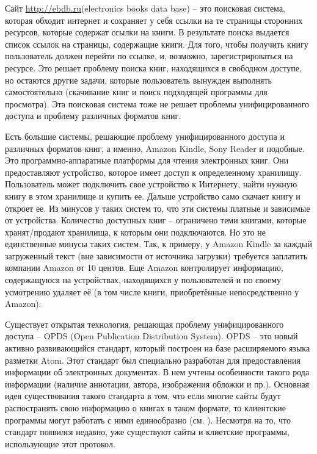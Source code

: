 \documentclass[a4paper]{report}
\begin{document}
Сайт \url{http://ebdb.ru}(electronics books data base)  -- это поисковая система, которая обходит интернет и сохраняет у себя ссылки на те страницы сторонних ресурсов, которые содержат ссылки на книги. В результате поиска выдается список ссылок на страницы, содержащие книги. Для того, чтобы получить книгу пользователь должен перейти по ссылке, и, возможно, зарегистрироваться на ресурсе. Это решает проблему поиска книг, находящихся в свободном доступе, но остаются другие задачи, которые пользователь вынужден выполнять самостоятельно (скачивание книг и поиск подходящей программы для просмотра). Эта поисковая система тоже не решает проблемы унифицированного доступа и проблему различных форматов книг.

Есть большие системы, решающие проблему унифицированного доступа и различных форматов книг, а именно, Amazon Kindle, Sony Reader и подобные. 
Это программно-аппаратные платформы для чтения электронных книг. Они предоставляют устройство, которое имеет доступ к определенному хранилищу. Пользователь может подключить свое устройство к Интернету, найти нужную книгу в этом хранилище и купить ее. Дальше устройство само скачает книгу и откроет ее.
Из минусов у таких систем то, что эти системы платные и зависимые от устройства. Количество доступных книг -- ограничено теми книгами, которые хранят/продают хранилища, к которым они подключаются. Но это не единственные минусы таких систем. Так, к примеру, у Amazon Kindle за каждый загруженный текст (вне зависимости от источника загрузки) требуется заплатить компании Amazon от 10 центов. Еще Amazon контролирует информацию, содержащуюся на устройствах, находящихся у пользователей и по своему усмотрению удаляет её (в том числе книги, приобретённые непосредственно у Amazon).

Существует открытая технология, решающая проблему унифицированного доступа  -- OPDS (Open Publication Distribution System).
OPDS -- это новый активно развивающийся стандарт, который построен на базе расширяемого языка разметки Atom. Этот стандарт был специально разработан для предоставления информации об электронных документах. В нем учтены особенности такого рода информации (наличие аннотации, автора, изображения обложки и пр.).
Основная идея существования такого стандарта в том, что если многие сайты будут распостранять свою информацию о книгах в таком формате, то клиентские программы могут работать с ними единообразно (см. ). Несмотря на то, что стандарт появился недавно, уже существуют сайты и клиетские программы, использующие этот протокол. 
\end{document}
